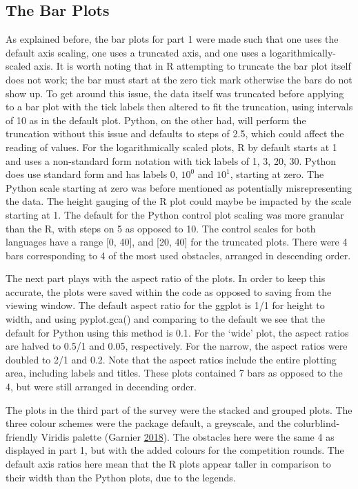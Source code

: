 \documentclass[
  11pt,
]{book}
\begin{document}
\subsection{The Bar Plots}

As explained before, the bar plots for part 1 were made such that one
uses the default axis scaling, one uses a truncated axis, and one uses a
logarithmically-scaled axis. It is worth noting that in R attempting to
truncate the bar plot itself does not work; the bar must start at the
zero tick mark otherwise the bars do not show up. To get around this
issue, the data itself was truncated before applying to a bar plot with
the tick labels then altered to fit the truncation, using intervals of
10 as in the default plot. Python, on the other had, will perform the
truncation without this issue and defaults to steps of 2.5, which could
affect the reading of values. For the logarithmically scaled plots, R by
default starts at 1 and uses a non-standard form notation with tick
labels of 1, 3, 20, 30. Python does use standard form and has labels 0,
\(10^0\) and \(10^1\), starting at zero. The Python scale starting at
zero was before mentioned as potentially misrepresenting the data. The
height gauging of the R plot could maybe be impacted by the scale
starting at 1. The default for the Python control plot scaling was more
granular than the R, with steps on 5 as opposed to 10. The control
scales for both languages have a range {[}0, 40{]}, and {[}20, 40{]} for
the truncated plots. There were 4 bars corresponding to 4 of the most
used obstacles, arranged in descending order.

The next part plays with the aspect ratio of the plots. In order to keep
this accurate, the plots were saved within the code as opposed to saving
from the viewing window. The default aspect ratio for the ggplot is 1/1
for height to width, and using pyplot.gca() and comparing to the default
we see that the default for Python using this method is 0.1. For the
`wide' plot, the aspect ratios are halved to 0.5/1 and 0.05,
respectively. For the narrow, the aspect ratios were doubled to 2/1 and
0.2. Note that the aspect ratios include the entire plotting area,
including labels and titles. These plots contained 7 bars as opposed to
the 4, but were still arranged in decending order.

The plots in the third part of the survey were the stacked and grouped
plots. The three colour schemes were the package default, a greyscale,
and the colurblind-friendly Viridis palette (Garnier
\protect\hyperlink{ref-viridis}{2018}). The obstacles here were the same
4 as displayed in part 1, but with the added colours for the competition
rounds. The default axis ratios here mean that the R plots appear taller
in comparison to their width than the Python plots, due to the legends.
\end{document}
